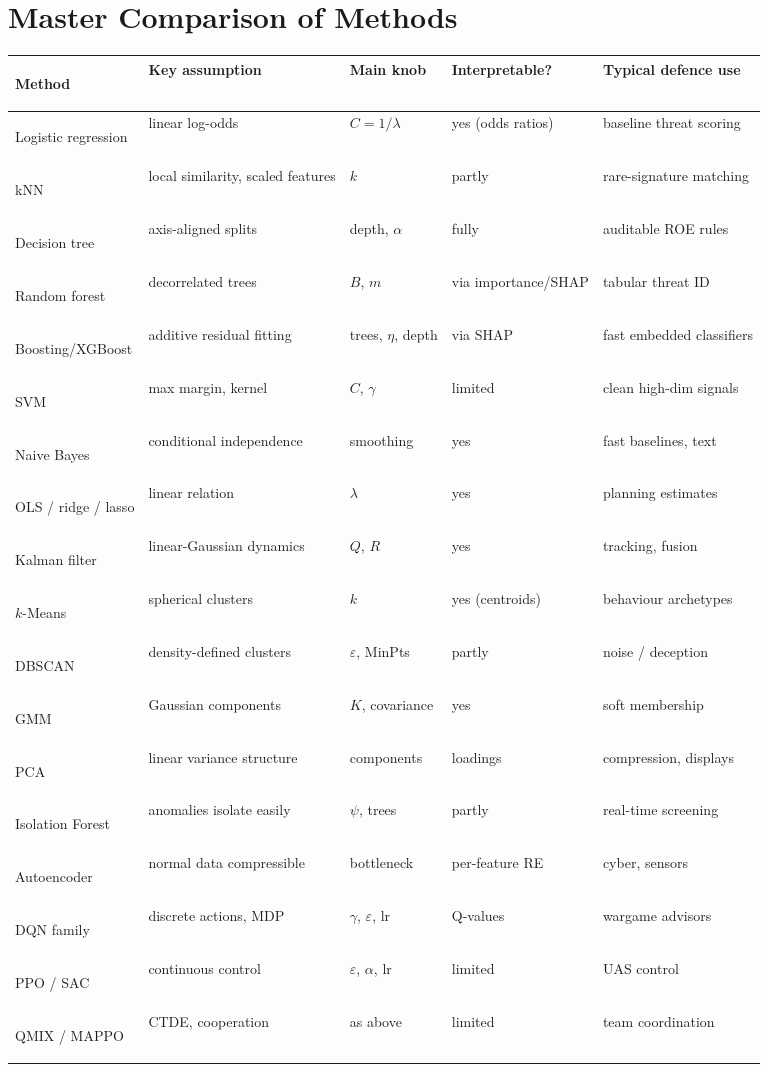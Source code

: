 \documentclass[11pt]{article}
\begin{document}
\section{Master Comparison of Methods}
\begin{center}\scriptsize\renewcommand{\arraystretch}{1.25}
\begin{tabularx}{\textwidth}{>{\bfseries\raggedright\arraybackslash}p{2.5cm}p{2.6cm}p{2.3cm}>{\raggedright\arraybackslash}p{1.9cm}X}\toprule Method & Key assumption & Main knob & Interpret\-able?  & Typical defence use\\\midrule
Logistic regression & linear log-odds & $C=1/\lambda$ & yes (odds ratios) & baseline threat scoring\\
kNN & local similarity, scaled features & $k$ & partly & rare-signature matching\\
Decision tree & axis-aligned splits & depth, $\alpha$ & fully & auditable ROE rules\\
Random forest & decorrelated trees & $B$, $m$ & via importance/SHAP & tabular threat ID\\
Boosting/\allowbreak XGBoost & additive residual fitting & trees, $\eta$, depth & via SHAP & fast embedded classifiers\\
SVM & max margin, kernel & $C$, $\gamma$ & limited & clean high-dim signals\\
Naive Bayes & conditional independence & smoothing & yes & fast baselines, text\\
OLS / ridge / lasso & linear relation & $\lambda$ & yes & planning estimates\\
Kalman filter & linear-Gaussian dynamics & $Q$, $R$ & yes & tracking, fusion\\
$k$-Means & spherical clusters & $k$ & yes (centroids) & behaviour archetypes\\
DBSCAN & density-defined clusters & $\varepsilon$, MinPts & partly & noise / deception\\
GMM & Gaussian components & $K$, covariance & yes & soft membership\\
PCA & linear variance structure & components & loadings & compression, displays\\
Isolation Forest & anomalies isolate easily & $\psi$, trees & partly & real-time screening\\
Autoencoder & normal data compressible & bottleneck & per-feature RE & cyber, sensors\\
DQN family & discrete actions, MDP & $\gamma$, $\varepsilon$, lr & Q-values & wargame advisors\\
PPO / SAC & continuous control & $\varepsilon$, $\alpha$, lr & limited & UAS control\\
QMIX / MAPPO & CTDE, cooperation & as above & limited & team coordination\\\bottomrule
\end{tabularx}\end{center}
\end{document}
